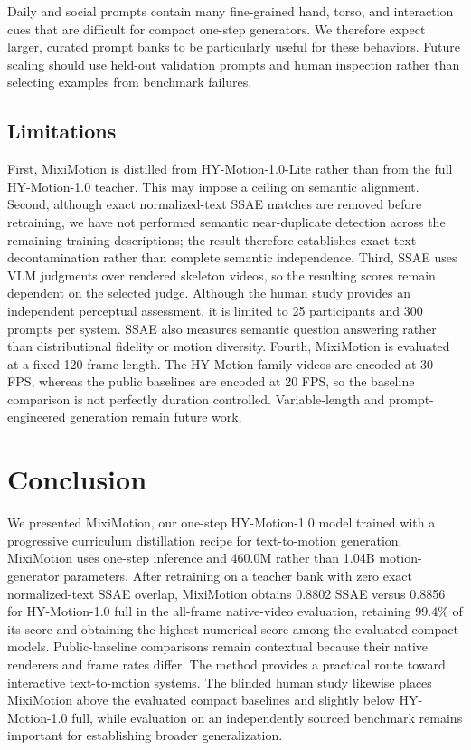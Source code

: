 \documentclass[runningheads]{llncs}
\begin{document}
Daily and social prompts contain many fine-grained hand, torso, and interaction
cues that are difficult for compact one-step generators. We therefore expect
larger, curated prompt banks to be particularly useful for these behaviors.
Future scaling should use held-out validation prompts and human inspection
rather than selecting examples from benchmark failures.

\subsection{Limitations}

First, MixiMotion is distilled from HY-Motion-1.0-Lite rather than
from the full HY-Motion-1.0 teacher. This may impose a ceiling on semantic
alignment. Second, although exact normalized-text SSAE matches are removed
before retraining, we have not performed semantic near-duplicate detection
across the remaining training descriptions; the result therefore establishes
exact-text decontamination rather than complete semantic independence. Third,
SSAE uses VLM judgments over rendered skeleton videos, so the resulting scores
remain dependent on the selected judge. Although the human study provides an
independent perceptual assessment, it is limited to 25 participants and 300
prompts per system. SSAE also measures semantic question answering rather than
distributional fidelity or motion diversity. Fourth, MixiMotion is evaluated
at a fixed 120-frame length. The HY-Motion-family
videos are encoded at 30 FPS, whereas the public baselines are encoded at
20 FPS, so the baseline comparison is not perfectly duration controlled.
Variable-length and prompt-engineered generation remain future work.

\section{Conclusion}

We presented MixiMotion, our one-step HY-Motion-1.0 model trained with a
progressive curriculum distillation recipe for text-to-motion generation.
MixiMotion uses one-step inference and 460.0M rather than 1.04B
motion-generator parameters. After retraining on a teacher bank with zero
exact normalized-text SSAE overlap, MixiMotion obtains 0.8802 SSAE versus
0.8856 for HY-Motion-1.0 full in the all-frame native-video evaluation,
retaining 99.4\% of its score and obtaining the highest numerical score among
the evaluated compact models. Public-baseline comparisons remain contextual
because their native renderers and frame rates differ. The method provides a
practical route toward interactive text-to-motion systems. The blinded human
study likewise places MixiMotion above the evaluated compact baselines and
slightly below HY-Motion-1.0 full, while evaluation on an independently
sourced benchmark remains important for establishing broader generalization.
\end{document}
